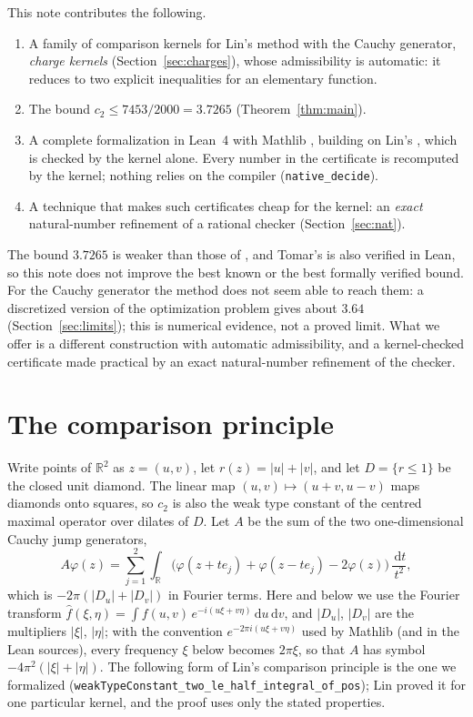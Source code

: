 \documentclass[11pt]{amsart}
\theoremstyle{definition}
\theoremstyle{remark}
\newcommand{\R}{\mathbb{R}}
\newcommand{\lean}[1]{\texttt{#1}}
\newcommand{\dd}{\,\mathrm{d}}
\begin{document}
This note contributes the following.
\begin{enumerate}[leftmargin=2em]
\item A family of comparison kernels for Lin's method with the Cauchy generator, \emph{charge
  kernels} (Section~\ref{sec:charges}), whose admissibility is automatic: it reduces to two
  explicit inequalities for an elementary function.
\item The bound $c_2 \le 7453/2000 = 3.7265$ (Theorem~\ref{thm:main}).
\item A complete formalization in Lean~4 \cite{Lean4} with Mathlib \cite{Mathlib}, building on
  Lin's \cite{LinRepo}, which is checked by the kernel alone. Every number in the certificate is
  recomputed by the kernel; nothing relies on the compiler (\lean{native\_decide}).
\item A technique that makes such certificates cheap for the kernel: an \emph{exact}
  natural-number refinement of a rational checker (Section~\ref{sec:nat}).
\end{enumerate}
The bound $3.7265$ is weaker than those of \cite{LinArticle,Tomar}, and Tomar's is also verified
in Lean, so this note does not improve the best known or the best formally verified bound. For the
Cauchy generator the method does not seem able to reach them: a discretized version of the
optimization problem gives about $3.64$ (Section~\ref{sec:limits}); this is numerical evidence, not a
proved limit. What we offer is a different construction with automatic admissibility, and a
kernel-checked certificate made practical by an exact natural-number refinement of the checker.

\section{The comparison principle}

Write points of $\R^2$ as $z = (u,v)$, let $r(z) = |u| + |v|$, and let
$D = \{ r \le 1 \}$ be the closed unit diamond. The linear map $(u,v) \mapsto (u+v, u-v)$ maps
diamonds onto squares, so $c_2$ is also the weak type constant of the centred maximal operator over
dilates of $D$. Let $A$ be the sum of the two one-dimensional Cauchy jump generators,
\[ A\varphi(z) = \sum_{j=1}^{2} \int_{\R} \bigl( \varphi(z + t e_j) + \varphi(z - t e_j) - 2\varphi(z) \bigr)\, \frac{\dd t}{t^2}, \]
which is $-2\pi(|D_u| + |D_v|)$ in Fourier terms. Here and below we use the Fourier transform
$\widehat f(\xi,\eta) = \int f(u,v)\, e^{-i(u\xi + v\eta)} \dd u \dd v$, and $|D_u|$, $|D_v|$ are the
multipliers $|\xi|$, $|\eta|$; with the convention $e^{-2\pi i(u\xi+v\eta)}$ used by Mathlib (and in the
Lean sources), every frequency $\xi$ below becomes $2\pi\xi$, so that $A$ has symbol
$-4\pi^2(|\xi|+|\eta|)$. The following form of Lin's comparison principle
is the one we formalized (\lean{weakTypeConstant\_two\_le\_half\_integral\_of\_pos}); Lin proved it
for one particular kernel, and the proof uses only the stated properties.
\end{document}
